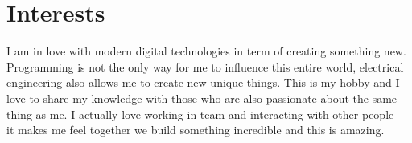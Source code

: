 \documentclass[]{cv-style}          %
\begin{document}
\section{Interests}
{\vspace{0.05cm}}
I am in love with modern digital technologies in term of creating something new. Programming is not the only way for me to influence this entire world, electrical engineering also allows me to create new unique things. This is my hobby and I love to share my knowledge with those who are also passionate about the same thing as me. I actually love working in team and interacting with other people -- it makes me feel together we build something incredible and this is amazing. 
\end{document}
